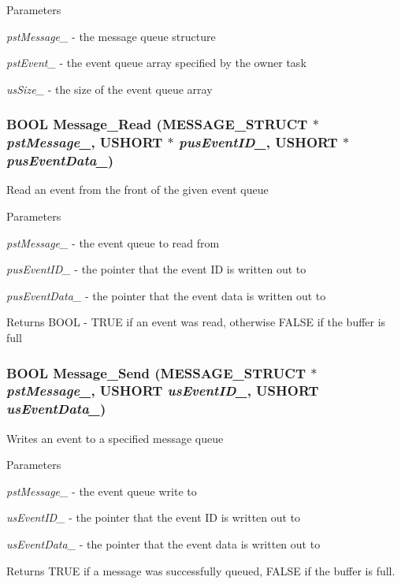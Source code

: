 \begin{DoxyParams}{Parameters}
\item[{\em pstMessage\_\-}]-\/ the message queue structure \item[{\em pstEvent\_\-}]-\/ the event queue array specified by the owner task \item[{\em usSize\_\-}]-\/ the size of the event queue array \end{DoxyParams}
\subsubsection[{Message\_\-Read}]{\setlength{\rightskip}{0pt plus 5cm}BOOL Message\_\-Read ({\bf MESSAGE\_\-STRUCT} $\ast$ {\em pstMessage\_\-}, \/  USHORT $\ast$ {\em pusEventID\_\-}, \/  USHORT $\ast$ {\em pusEventData\_\-})}\label{message_8h_a96bd8e59324fd33ba603fea8a57b6dc6}
Read an event from the front of the given event queue


\begin{DoxyParams}{Parameters}
\item[{\em pstMessage\_\-}]-\/ the event queue to read from \item[{\em pusEventID\_\-}]-\/ the pointer that the event ID is written out to \item[{\em pusEventData\_\-}]-\/ the pointer that the event data is written out to \end{DoxyParams}
\begin{DoxyReturn}{Returns}
BOOL -\/ TRUE if an event was read, otherwise FALSE if the buffer is full 
\end{DoxyReturn}
\subsubsection[{Message\_\-Send}]{\setlength{\rightskip}{0pt plus 5cm}BOOL Message\_\-Send ({\bf MESSAGE\_\-STRUCT} $\ast$ {\em pstMessage\_\-}, \/  USHORT {\em usEventID\_\-}, \/  USHORT {\em usEventData\_\-})}\label{message_8h_aa5e03ba4c6f9e1b47f8fc9a7495a4b6e}
Writes an event to a specified message queue


\begin{DoxyParams}{Parameters}
\item[{\em pstMessage\_\-}]-\/ the event queue write to \item[{\em usEventID\_\-}]-\/ the pointer that the event ID is written out to \item[{\em usEventData\_\-}]-\/ the pointer that the event data is written out to \end{DoxyParams}
\begin{DoxyReturn}{Returns}
TRUE if a message was successfully queued, FALSE if the buffer is full. 
\end{DoxyReturn}
